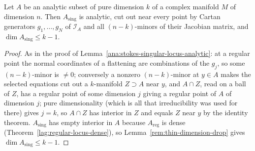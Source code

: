 \begin{lemma}
\label{rem:pure-singular-locus}
\leanok
Let \(A\) be an analytic subset of pure dimension \(k\) of a complex manifold \(M\) of dimension \(n\). Then \(A_{\mathrm{sing}}\) is analytic, cut out near every
point by Cartan generators \(g_1,\dots,g_N\) of \(\mathcal I_A\) and all \((n-k)\)-minors of their Jacobian matrix, and \(\dim A_{\mathrm{sing}}\le k-1\).
\end{lemma}
\begin{proof}
\leanok
As in the proof of Lemma~\ref{ana:stokes-singular-locus-analytic}: at a regular point the normal coordinates of a flattening are combinations of the
\(g_j\), so some \((n-k)\)-minor is \(\ne0\); conversely a nonzero \((n-k)\)-minor at \(y\in A\) makes the selected equations cut out a \(k\)-manifold \(Z\supset A\)
near \(y\), and \(A\cap Z\), read on a ball of \(Z\), has a regular point of some dimension \(j\) giving a regular point of \(A\) of dimension \(j\); pure dimensionality
(which is all that irreducibility was used for there) gives \(j=k\), so \(A\cap Z\) has interior in \(Z\) and equals \(Z\) near \(y\) by the identity theorem. \(A_{\mathrm{sing}}\) has empty interior in \(A\) because
\(A_{\mathrm{reg}}\) is dense (Theorem~\ref{lag:regular-locus-dense}), so Lemma~\ref{rem:thin-dimension-drop} gives \(\dim A_{\mathrm{sing}}\le k-1\).
\end{proof}

